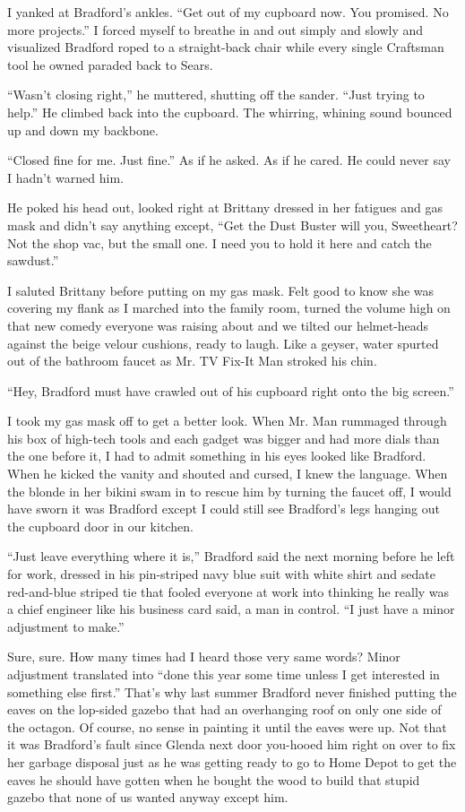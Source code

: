\documentclass[
]{article}
\begin{document}
I yanked at Bradford's ankles. ``Get out of my cupboard now. You
promised. No more pro­jects.'' I forced myself to breathe in and out
simply and slowly and visualized Bradford roped to a straight-back chair
while every single Craftsman tool he owned paraded back to Sears.

``Wasn't closing right,'' he muttered, shutting off the sander. ``Just
trying to help.'' He climbed back into the cupboard. The whirring,
whining sound bounced up and down my backbone.

``Closed fine for me. Just fine.'' As if he asked. As if he cared. He
could never say I hadn't warned him.

He poked his head out, looked right at Brittany dressed in her fatigues
and gas mask and didn't say anything except, ``Get the Dust Buster will
you, Sweetheart? Not the shop vac, but the small one. I need you to hold
it here and catch the sawdust.''

I saluted Brittany before putting on my gas mask. Felt good to know she
was covering my flank as I marched into the family room, turned the
volume high on that new comedy everyone was raising about and we tilted
our helmet-heads against the beige velour cushions, ready to laugh. Like
a geyser, water spurted out of the bathroom faucet as Mr. TV Fix-It Man
stroked his chin.

``Hey, Bradford must have crawled out of his cupboard right onto the big
screen.''

I took my gas mask off to get a better look. When Mr. Man rummaged
through his box of high-tech tools and each gadget was bigger and had
more dials than the one before it, I had to admit something in his eyes
looked like Bradford. When he kicked the vanity and shouted and cursed,
I knew the language. When the blonde in her bikini swam in to rescue him
by turning the faucet off, I would have sworn it was Bradford except I
could still see Bradford's legs hanging out the cupboard door in our
kitchen.

``Just leave everything where it is,'' Bradford said the next morning
before he left for work, dressed in his pin-striped navy blue suit with
white shirt and sedate red-and-blue striped tie that fooled everyone at
work into thinking he really was a chief engineer like his business card
said, a man in con­trol. ``I just have a minor adjustment to make.''

Sure, sure. How many times had I heard those very same words? Minor
adjustment translated into ``done this year some time unless I get
interested in something else first.'' That's why last summer Bradford
never finished putting the eaves on the lop-sided gazebo that had an
overhanging roof on only one side of the octagon. Of course, no sense in
painting it until the eaves were up. Not that it was Bradford's fault
since Glenda next door you-hooed him right on over to fix her garbage
disposal just as he was getting ready to go to Home Depot to get the
eaves he should have gotten when he bought the wood to build that stupid
gazebo that none of us wanted anyway except him.
\end{document}
